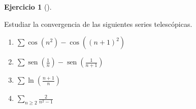 \documentclass[
  spanish,
  a4paper,
]{scrreport}
\theoremstyle{definition}
\newtheorem{exercise}{Ejercicio}[chapter]
\theoremstyle{remark}
\begin{document}
\begin{exercise}[]\protect\hypertarget{exr-series-telescopicas}{}\label{exr-series-telescopicas}

Estudiar la convergencia de las siguientes series telescópicas.

\begin{enumerate}
\def\labelenumi{\alph{enumi}.}
\item
  \(\sum \cos(n^2)-\cos((n+1)^2)\)
\item
  \(\sum \operatorname{sen}\left(\frac{1}{n}\right)-\operatorname{sen}\left(\frac{1}{n+1}\right)\)
\item
  \(\sum \ln\left(\frac{n+1}{n}\right)\)
\item
  \(\sum_{n\geq 2} \frac{2}{n^2-1}\)
\end{enumerate}

\end{exercise}
\end{document}
